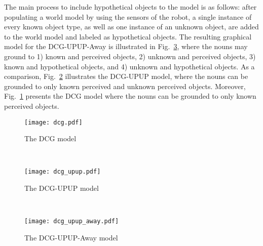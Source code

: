 The main process to include hypothetical objects to the model is as follows: after populating a world model by using the sensors of the robot, a single instance of every known object type, as well as one instance of an unknown object, are added to the world model and labeled as hypothetical objects. The resulting graphical model for the DCG-UPUP-Away is illustrated in Fig.~\ref{fig:dcg-upup-away}, where the nouns may ground to 1) known and perceived objects, 2) unknown and perceived objects, 3) known and hypothetical objects, and 4) unknown and hypothetical objects. As a comparison, Fig.~\ref{fig:dcg-upup} illustrates the DCG-UPUP model, where the nouns can be grounded to only known perceived and unknown perceived objects. Moreover, Fig.~\ref{fig:dcg} presents the DCG model where the nouns can be grounded to only known perceived objects.

\begin{figure*}
\centering
\begin{subfigure}[t]{0.235\textwidth}
\centering
\texttt{[image: dcg.pdf]}
\caption{The DCG model}
\label{fig:dcg}
\end{subfigure}
~
\begin{subfigure}[t]{0.31\textwidth}
\centering
\texttt{[image: dcg\_upup.pdf]}
\caption{The DCG-UPUP model}
\label{fig:dcg-upup}
\end{subfigure}
~
\begin{subfigure}[t]{0.4\textwidth}
\centering
\texttt{[image: dcg\_upup\_away.pdf]}
\caption{The DCG-UPUP-Away model}
\label{fig:dcg-upup-away}
\end{subfigure}
\caption{The graphical models constructed for the command ``\emph{move to the cone}".}
\end{figure*}

